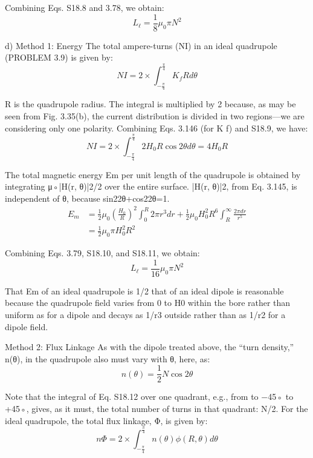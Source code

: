 Combining Eqs. S18.8 and 3.78, we obtain:
 \begin{equation}%
L_\ell=\frac{1}{8}\mu_0\pi N^2
\end{equation}

d) Method 1: Energy The total ampere-turns (NI) in an ideal quadrupole
(PROBLEM 3.9) is given by:
 \begin{equation}%
NI=2\times\int_{-\frac{\pi}{4}}^{\frac{\pi}{4}}K_fRd\theta
\end{equation}

R is the quadrupole radius. The integral is multiplied by 2 because, as may be
seen from Fig. 3.35(b), the current distribution is divided in two regions—we are
considering only one polarity. Combining Eqs. 3.146 (for K f) and S18.9, we have:
 \begin{equation}%
NI=2\times\int_{-\frac{\pi}{4}}^{\frac{\pi}{4}}2H_0R\cos 2\theta d\theta=4H_0R
\end{equation}

The total magnetic energy Em per unit length of the quadrupole is obtained by
integrating μ◦|H(r, θ)|2/2 over the entire surface. |H(r, θ)|2, from Eq. 3.145, is
independent of θ, because sin22θ+cos22θ=1.
\begin{equation}%
\begin{split}
E_m&=\frac{1}{2}\mu_0(\frac{H_0}{R})^2\int_{0}^{R}2\pi r^3dr+\frac{1}{2}\mu_0H_{0}^{2}R^6\int_{R}^{\infty}\frac{2\pi dr}{r^5}\\
&=\frac{1}{2}\mu_0\pi H_{0}^{2}R^2
\end{split}
\end{equation}

Combining Eqs. 3.79, S18.10, and S18.11, we obtain:
 \begin{equation}%
L_\ell=\frac{1}{16}\mu_0\pi N^2
\end{equation}

That Em of an ideal quadrupole is 1/2 that of an ideal dipole is reasonable because
the quadrupole field varies from 0 to H0 within the bore rather than uniform as
for a dipole and decays as 1/r3 outside rather than as 1/r2 for a dipole field.

Method 2: Flux Linkage As with the dipole treated above, the “turn density,”
n(θ), in the quadrupole also must vary with θ, here, as:
 \begin{equation}%
n(\theta)=\frac{1}{2}N\cos 2\theta
\end{equation}

Note that the integral of Eq. S18.12 over one quadrant, e.g., from to −45◦ to
+45◦, gives, as it must, the total number of turns in that quadrant: N/2. For the
ideal quadrupole, the total flux linkage, Φ, is given by:
 \begin{equation}%
n\Phi=2\times\int_{-\frac{\pi}{4}}^{\frac{\pi}{4}}n(\theta)\phi(R,\theta)d\theta
\end{equation}

